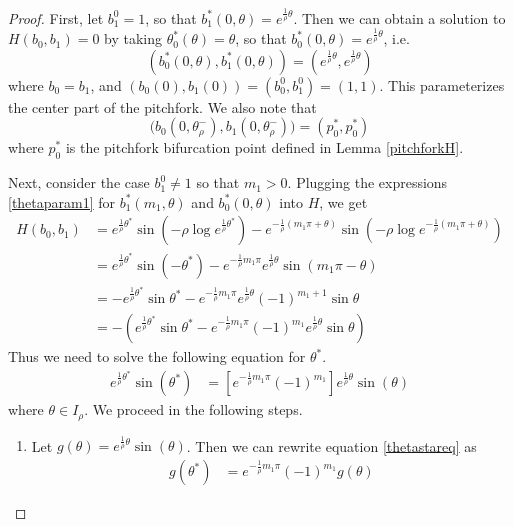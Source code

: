 \documentclass[thesis.tex]{subfiles}
\begin{document}
\begin{lemma}
\begin{proof}
First, let $b_1^0 = 1$, so that $b_1^*(0, \theta) = e^{ \frac{1}{\rho}\theta}$. Then we can obtain a solution to $H(b_0, b_1) = 0$ by taking $\theta_0^*(\theta) = \theta$, so that $b_0^*(0, \theta) = e^{ \frac{1}{\rho}\theta}$, i.e. 
\[
( b_0^*(0, \theta), b_1^*(0, \theta) ) = ( e^{ \frac{1}{\rho}\theta }, e^{ \frac{1}{\rho}\theta })
\]
where $b_0 = b_1$, and $(b_0(0), b_1(0)) = (b_0^0, b_1^0) = (1,1)$. This parameterizes the center part of the pitchfork. We also note that
\begin{equation}\label{centerpitchforkparam}
\Big(b_0(0, \theta_\rho^-), b_1(0, \theta_\rho^-)\Big) = (p_0^*, p_0^*)
\end{equation}
where $p_0^*$ is the pitchfork bifurcation point defined in Lemma \ref{pitchforkH}.

Next, consider the case $b_1^0 \neq 1$ so that $m_1 > 0$. Plugging the expressions \eqref{thetaparam1} for $b_1^*(m_1, \theta)$ and $b_0^*(0, \theta)$ into $H$, we get
\begin{align*}
H(b_0, b_1) &= e^{ \frac{1}{\rho}\theta^* } \sin\left( -\rho \log e^{ \frac{1}{\rho}\theta^* }\right) - e^{ -\frac{1}{\rho}(m_1 \pi + \theta) }\sin \left( -\rho \log e^{ -\frac{1}{\rho}(m_1 \pi + \theta) } \right) \\
&= e^{ \frac{1}{\rho}\theta^* } \sin\left( -\theta^* \right) - e^{ -\frac{1}{\rho} m_1 \pi} e^{ \frac{1}{\rho} \theta } \sin(m_1 \pi - \theta) \\
&= -e^{ \frac{1}{\rho}\theta^* } \sin \theta^*  - e^{ -\frac{1}{\rho} m_1 \pi } e^{ \frac{1}{\rho} \theta } (-1)^{m_1 + 1} \sin\theta \\
&= -\left( e^{ \frac{1}{\rho}\theta^* } \sin \theta^* - e^{ -\frac{1}{\rho} m_1 \pi } (-1)^{m_1} e^{ \frac{1}{\rho} \theta } \sin \theta \right)
\end{align*}
Thus we need to solve the following equation for $\theta^*$.
\begin{align}\label{thetastareq}
e^{ \frac{1}{\rho}\theta^* } \sin\left( \theta^* \right) &= \left[ e^{ -\frac{1}{\rho} m_1 \pi } (-1)^{m_1} \right] e^{ \frac{1}{\rho} \theta } \sin(\theta)
\end{align}
where $\theta \in I_\rho$. We proceed in the following steps.
\begin{enumerate}
	\item Let $g(\theta) = e^{ \frac{1}{\rho} \theta } \sin(\theta)$. Then we can rewrite equation \eqref{thetastareq} as
	\begin{align}\label{thetastareq2}
	g(\theta^*) &= e^{ -\frac{1}{\rho} m_1 \pi } (-1)^{m_1} g(\theta)

\end{align}
\end{enumerate}
\end{proof}
\end{lemma}
\end{document}
